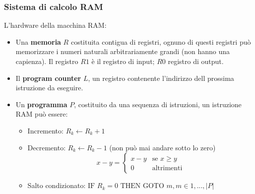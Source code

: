 \documentclass{article}
\begin{document}
\subsubsection{Sistema di calcolo RAM}
L'hardware della macchina RAM:
\begin{itemize}
    \item Una \textbf{memoria} $R$ costituita contigua di registri, ognuno di questi registri può memorizzare
          i numeri naturali arbitrariamente grandi (non hanno una capienza).
          Il registro $R1$ è il registro di input; $R0$ registro di output.

    \item Il \textbf{program counter} $L$, un registro contenente l'indirizzo dell prossima
          istruzione da eseguire.

    \item Un \textbf{programma} $P$, costituito da una  sequenza di istruzioni, un istruzione RAM può essere:
          \begin{itemize}
              \item Incremento: $R_k \leftarrow R_k +1$
              \item Decremento: $R_k \leftarrow R_k -1$ (non può mai andare sotto lo zero)
                    \[
                        x-y=
                        \begin{cases}
                            x-y & \text{se } x\geq y \\
                            0   & \text{altrimenti}
                        \end{cases}
                    \]
              \item Salto condizionato: $\text{IF } R_k=0\text{ THEN GOTO } m, m\in{1,...,|P|}$
          \end{itemize}
\end{itemize}
\end{document}
